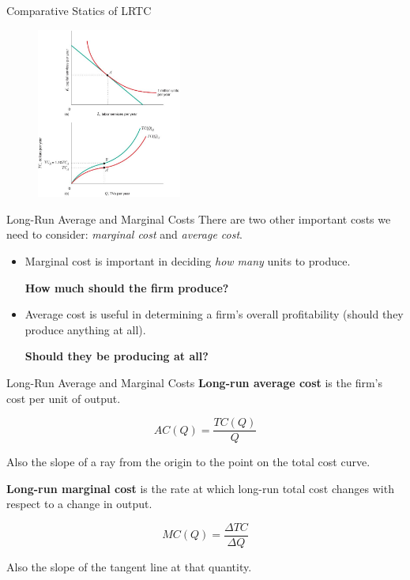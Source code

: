 \documentclass[11pt,t]{beamer}
\begin{document}
\begin{frame}{Comparative Statics of LRTC}
  \begin{figure}
    \includegraphics[width=180px]{figures/fig8_5.jpg}
  \end{figure}
\end{frame}

\begin{frame}{Long-Run Average and Marginal Costs}
  There are two other important costs we need to consider: \emph{marginal cost} and \emph{average cost}.

  \begin{itemize}
    \item Marginal cost is important in deciding \emph{how many} units to produce.
    
    \smallskip\textbf{How much should the firm produce?}
    
    \bigskip
    \item Average cost is useful in determining a firm's overall profitability (should they produce anything at all).
    
    \smallskip\textbf{Should they be producing at all?}
  \end{itemize}
\end{frame}

\begin{frame}{Long-Run Average and Marginal Costs}
  \textbf{Long-run average cost} is the firm's cost per unit of output.

  $$AC(Q) = \frac{TC(Q)}{Q}$$

  Also the slope of a ray from the origin to the point on the total cost curve.


  \bigskip
  \textbf{Long-run marginal cost} is the rate at which long-run total cost changes with respect to a change in output.

  $$MC(Q) = \frac{\Delta TC}{\Delta Q}$$

  Also the slope of the tangent line at that quantity.
\end{frame}
\end{document}
